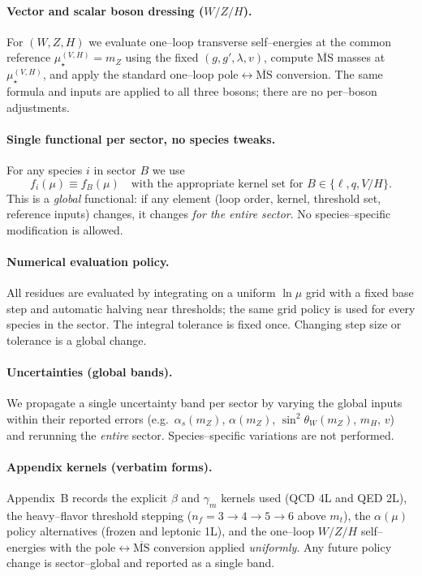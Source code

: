 \documentclass[epjc3]{svjour3}
\begin{document}
\paragraph{Vector and scalar boson dressing ($W/Z/H$).}
For $(W,Z,H)$ we evaluate one–loop transverse self–energies at the common reference $\mu_\star^{(V,H)}=m_Z$ using the fixed $(g,g',\lambda,v)$, compute $\overline{\mathrm{MS}}$ masses at $\mu_\star^{(V,H)}$, and apply the standard one–loop pole$\leftrightarrow\overline{\mathrm{MS}}$ conversion. The same formula and inputs are applied to all three bosons; there are no per–boson adjustments.

\paragraph{Single functional per sector, no species tweaks.}
For any species $i$ in sector $B$ we use
\[
f_i(\mu)\equiv f_B(\mu)\quad\text{with the appropriate kernel set for }B\in\{\ell,q,V/H\}.
\]
This is a \emph{global} functional: if any element (loop order, kernel, threshold set, reference inputs) changes, it changes \emph{for the entire sector}. No species–specific modification is allowed.

\paragraph{Numerical evaluation policy.}
All residues are evaluated by integrating on a uniform $\ln\mu$ grid with a fixed base step and automatic halving near thresholds; the same grid policy is used for every species in the sector. The integral tolerance is fixed once. Changing step size or tolerance is a global change.

\paragraph{Uncertainties (global bands).}
We propagate a single uncertainty band per sector by varying the global inputs within their reported errors (e.g.\ $\alpha_s(m_Z)$, $\alpha(m_Z)$, $\sin^2\theta_W(m_Z)$, $m_H$, $v$) and rerunning the \emph{entire} sector. Species–specific variations are not performed.

\paragraph{Appendix kernels (verbatim forms).}
Appendix~B records the explicit $\beta$ and $\gamma_m$ kernels used (QCD 4L and QED 2L), the heavy--flavor threshold stepping ($n_f=3\!\to\!4\!\to\!5\!\to\!6$ above $m_t$), the $\alpha(\mu)$ policy alternatives (frozen and leptonic 1L), and the one--loop $W/Z/H$ self--energies with the pole$\leftrightarrow\overline{\mathrm{MS}}$ conversion applied \emph{uniformly}. Any future policy change is sector--global and reported as a single band.
\end{document}
